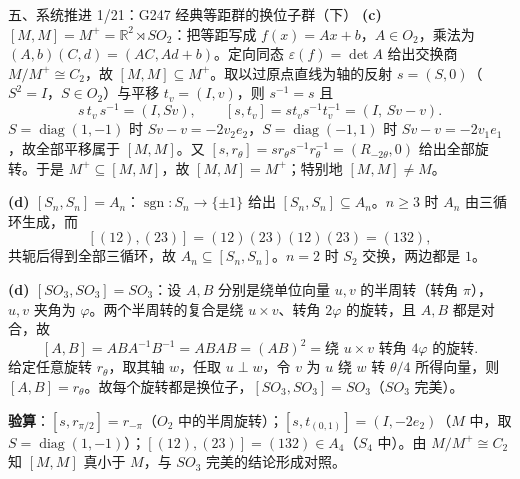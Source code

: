 \documentclass[aspectratio=169,10pt,fontset=none]{ctexbeamer}
\newcommand{\key}[1]{\textcolor{ink}{\bfseries #1}}
\begin{document}
\begin{frame}[t]{五、系统推进 1/21：G247 经典等距群的换位子群（下）}
\scriptsize
\key{(c) $[M,M]=M^+=\mathbb R^2\rtimes SO_2$}：把等距写成 $f(x)=Ax+b$，$A\in O_2$，乘法为 $(A,b)(C,d)=(AC,Ad+b)$。定向同态 $\varepsilon(f)=\det A$ 给出交换商 $M/M^+\cong C_2$，故 $[M,M]\subseteq M^+$。取以过原点直线为轴的反射 $s=(S,0)$（$S^2=I$，$S\in O_2$）与平移 $t_v=(I,v)$，则 $s^{-1}=s$ 且
\[ s\,t_v\,s^{-1}=(I,Sv),\qquad [s,t_v]=s t_v s^{-1}t_v^{-1}=(I,\,Sv-v). \]
$S=\operatorname{diag}(1,-1)$ 时 $Sv-v=-2v_2e_2$，$S=\operatorname{diag}(-1,1)$ 时 $Sv-v=-2v_1e_1$，故全部平移属于 $[M,M]$。又 $[s,r_\theta]=s r_\theta s^{-1}r_\theta^{-1}=(R_{-2\theta},0)$ 给出全部旋转。于是 $M^+\subseteq[M,M]$，故 $[M,M]=M^+$；特别地 $[M,M]\neq M$。

\key{(d) $[S_n,S_n]=A_n$}：$\operatorname{sgn}:S_n\to\{\pm1\}$ 给出 $[S_n,S_n]\subseteq A_n$。$n\ge3$ 时 $A_n$ 由三循环生成，而
\[ [(12),(23)]=(12)(23)(12)(23)=(132), \]
共轭后得到全部三循环，故 $A_n\subseteq[S_n,S_n]$。$n=2$ 时 $S_2$ 交换，两边都是 $1$。

\key{(d) $[SO_3,SO_3]=SO_3$}：设 $A,B$ 分别是绕单位向量 $u,v$ 的半周转（转角 $\pi$），$u,v$ 夹角为 $\varphi$。两个半周转的复合是绕 $u\times v$、转角 $2\varphi$ 的旋转，且 $A,B$ 都是对合，故
\[ [A,B]=ABA^{-1}B^{-1}=ABAB=(AB)^2=\text{绕 }u\times v\text{ 转角 }4\varphi\text{ 的旋转}. \]
给定任意旋转 $r_\theta$，取其轴 $w$，任取 $u\perp w$，令 $v$ 为 $u$ 绕 $w$ 转 $\theta/4$ 所得向量，则 $[A,B]=r_\theta$。故每个旋转都是换位子，$[SO_3,SO_3]=SO_3$（$SO_3$ 完美）。

\key{验算}：$[s,r_{\pi/2}]=r_{-\pi}$（$O_2$ 中的半周旋转）；$[s,t_{(0,1)}]=(I,-2e_2)$（$M$ 中，取 $S=\operatorname{diag}(1,-1)$）；$[(12),(23)]=(132)\in A_4$（$S_4$ 中）。由 $M/M^+\cong C_2$ 知 $[M,M]$ 真小于 $M$，与 $SO_3$ 完美的结论形成对照。
\end{frame}
\end{document}
